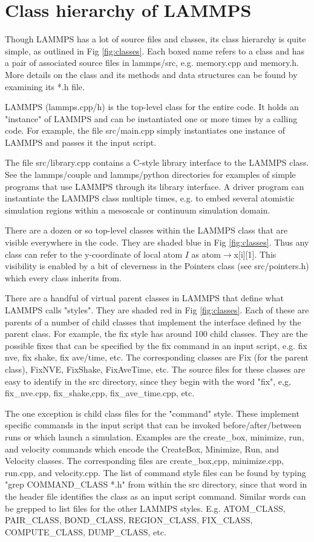 \documentclass{article}
\begin{document}
\pagebreak
\section{Class hierarchy of LAMMPS}

Though LAMMPS has a lot of source files and classes, its class
hierarchy is quite simple, as outlined in Fig \ref{fig:classes}.  Each
boxed name refers to a class and has a pair of associated source files
in lammps/src, e.g. memory.cpp and memory.h.  More details on the
class and its methods and data structures can be found by examining
its *.h file.

LAMMPS (lammps.cpp/h) is the top-level class for the entire code.  It
holds an "instance" of LAMMPS and can be instantiated one or more
times by a calling code.  For example, the file src/main.cpp simply
instantiates one instance of LAMMPS and passes it the input script.

The file src/library.cpp contains a C-style library interface to the
LAMMPS class.  See the lammps/couple and lammps/python directories for
examples of simple programs that use LAMMPS through its library
interface.  A driver program can instantiate the LAMMPS class multiple
times, e.g. to embed several atomistic simulation regions within a
mesoscale or continuum simulation domain.

There are a dozen or so top-level classes within the LAMMPS class that
are visible everywhere in the code.  They are shaded blue in Fig
\ref{fig:classes}.  Thus any class can refer to the y-coordinate of
local atom $I$ as atom$\rightarrow$x[i][1].  This visibility is
enabled by a bit of cleverness in the Pointers class (see
src/pointers.h) which every class inherits from.

There are a handful of virtual parent classes in LAMMPS that define
what LAMMPS calls "styles".  They are shaded red in Fig
\ref{fig:classes}.  Each of these are parents of a number of child
classes that implement the interface defined by the parent class.  For
example, the fix style has around 100 child classes.  They are the
possible fixes that can be specified by the fix command in an input
script, e.g. fix nve, fix shake, fix ave/time, etc.  The corresponding
classes are Fix (for the parent class), FixNVE, FixShake, FixAveTime,
etc.  The source files for these classes are easy to identify in the
src directory, since they begin with the word "fix", e,g,
fix\_nve.cpp, fix\_shake,cpp, fix\_ave\_time.cpp, etc.

The one exception is child class files for the "command" style.  These
implement specific commands in the input script that can be invoked
before/after/between runs or which launch a simulation.  Examples are
the create\_box, minimize, run, and velocity commands which encode the
CreateBox, Minimize, Run, and Velocity classes.  The corresponding
files are create\_box,cpp, minimize.cpp, run.cpp, and velocity.cpp.
The list of command style files can be found by typing "grep
COMMAND\_CLASS *.h" from within the src directory, since that word in
the header file identifies the class as an input script command.
Similar words can be grepped to list files for the other LAMMPS
styles.  E.g. ATOM\_CLASS, PAIR\_CLASS, BOND\_CLASS, REGION\_CLASS,
FIX\_CLASS, COMPUTE\_CLASS, DUMP\_CLASS, etc.
\end{document}
